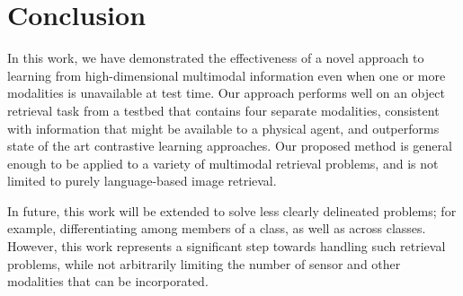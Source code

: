 \documentclass[10pt]{article} %
\newcommand{\todokdinline}[1]{\todo[color=red!20,inline]{{KD: \small #1}}}
\newcommand{\todocmi}[1]{\todo[inline,color=green!40]{\small #1 -- Cynthia}}
\begin{document}

\section{Conclusion}
\label{sec:conclusion}


In this work, we have demonstrated the effectiveness of a novel approach to learning from high-dimensional multimodal information even when one or more modalities is unavailable at test time. Our approach performs well on an object retrieval task from a testbed that contains four separate modalities, consistent with information that might be available to a physical agent, and outperforms state of the art contrastive learning approaches. 
Our proposed method is general enough to be applied to a variety of multimodal retrieval problems, and is not limited to purely language-based image retrieval.

In future, this work will be extended to solve less clearly delineated problems; for example, differentiating among members of a class, as well as across classes. However, this work represents a significant step towards handling such retrieval problems, while not arbitrarily limiting the number of sensor and other modalities that can be incorporated. 










\appendix
\label{sec:appendix}
% 
\end{document}
